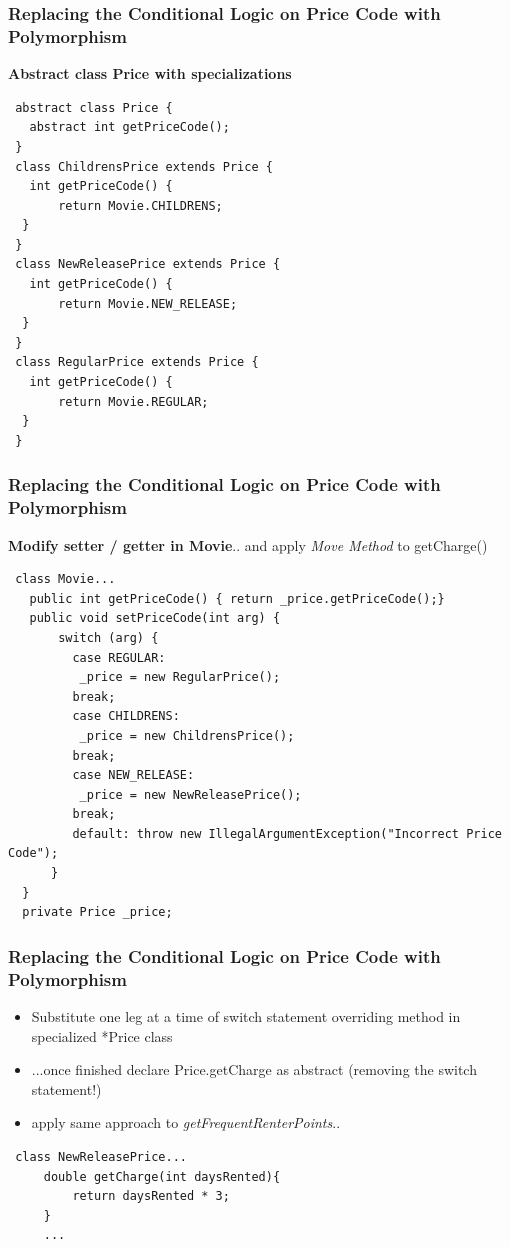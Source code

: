 \documentclass{beamer}
\begin{document}
\begin{frame}[containsverbatim]
  \frametitle{Replacing the Conditional Logic on Price Code with Polymorphism}
  \textbf{Abstract class Price with specializations}
  \begin{lstlisting}
 abstract class Price {
   abstract int getPriceCode();
 }
 class ChildrensPrice extends Price {
   int getPriceCode() {
       return Movie.CHILDRENS;
  }
 }
 class NewReleasePrice extends Price {
   int getPriceCode() {
       return Movie.NEW_RELEASE;
  }
 }
 class RegularPrice extends Price {
   int getPriceCode() {
       return Movie.REGULAR;
  }
 }
	\end{lstlisting}
\end{frame}

\begin{frame}[containsverbatim]
  \frametitle{Replacing the Conditional Logic on Price Code with Polymorphism}
  \textbf{Modify setter / getter in Movie}.. and apply \textit{Move Method} to getCharge()
  \begin{lstlisting}
 class Movie...
   public int getPriceCode() { return _price.getPriceCode();}
   public void setPriceCode(int arg) {
       switch (arg) {
         case REGULAR:
          _price = new RegularPrice();
         break;
         case CHILDRENS:
          _price = new ChildrensPrice();
         break;
         case NEW_RELEASE:
          _price = new NewReleasePrice();
         break;
         default: throw new IllegalArgumentException("Incorrect Price Code");
      }
  }
  private Price _price;
	\end{lstlisting}
\end{frame}

\begin{frame}[containsverbatim]
  \frametitle{Replacing the Conditional Logic on Price Code with Polymorphism}
  \begin{itemize}
  		\item Substitute one leg at a time of switch statement overriding method in specialized *Price class
		\item ...once finished declare Price.getCharge as abstract (removing the switch statement!)
		\item apply same approach to \textit{getFrequentRenterPoints}..
  \end{itemize}
  \begin{lstlisting}
 class NewReleasePrice...
     double getCharge(int daysRented){
         return daysRented * 3;
     }
     ...
	\end{lstlisting}
\end{frame}
\end{document}
